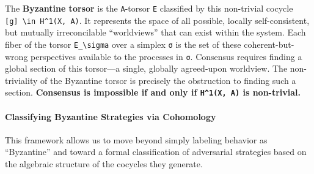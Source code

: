 \documentclass[
]{article}
\begin{document}
The \textbf{Byzantine torsor} is the \texttt{A}-torsor \texttt{E}
classified by this non-trivial cocycle
\texttt{{[}g{]}\ \textbackslash{}in\ H\^{}1(X,\ A)}. It represents the
space of all possible, locally self-consistent, but mutually
irreconcilable ``worldviews'' that can exist within the system. Each
fiber of the torsor \texttt{E\_\textbackslash{}sigma} over a simplex
\texttt{σ} is the set of these coherent-but-wrong perspectives available
to the processes in \texttt{σ}. Consensus requires finding a global
section of this torsor---a single, globally agreed-upon worldview. The
non-triviality of the Byzantine torsor is precisely the obstruction to
finding such a section. \textbf{Consensus is impossible if and only if
\texttt{H\^{}1(X,\ A)} is non-trivial.}

\paragraph{Classifying Byzantine Strategies via
Cohomology}\label{classifying-byzantine-strategies-via-cohomology}

This framework allows us to move beyond simply labeling behavior as
``Byzantine'' and toward a formal classification of adversarial
strategies based on the algebraic structure of the cocycles they
generate.
\end{document}
